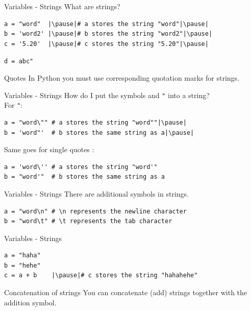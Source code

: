 \documentclass[dvipsnames, svgnames, x11names]{beamer}
\begin{document}
\begin{frame}[fragile]{Variables - Strings}
What are strings?\pause\\

\begin{verbatim}
a = "word"  |\pause|# a stores the string "word"|\pause|
b = 'word2' |\pause|# b stores the string "word2"|\pause|
c = '5.20'  |\pause|# c stores the string "5.20"|\pause|
\end{verbatim}
\vspace{-0.275em}
\texttt{d = }{\color{BrickRed}\texttt{\textquotesingle abc"}}\pause {} \pause
\begin{block}{Quotes}
In Python you must use corresponding quotation marks for strings.
\end{block}
\end{frame}

\begin{frame}[fragile]{Variables - Strings}
How do I put the symbols \texttt{\textquotesingle} and \texttt{"} into a string?\pause\\
For \texttt{"}:\pause
	
\begin{verbatim}
a = "word\"" # a stores the string "word""|\pause|
b = 'word"'  # b stores the same string as a|\pause|
\end{verbatim}
\vspace{1em}
Same goes for single quotes \texttt{\textquotesingle}:
\begin{verbatim}
a = 'word\'' # a stores the string "word'"
b = "word'"  # b stores the same string as a
\end{verbatim}
\end{frame}

\begin{frame}[fragile]{Variables - Strings}
There are additional symbols in strings.
\begin{verbatim}
a = "word\n" # \n represents the newline character
b = "word\t" # \t represents the tab character
\end{verbatim}
\end{frame}

\begin{frame}[fragile]{Variables - Strings}
\begin{verbatim}
a = "haha"
b = "hehe"
c = a + b    |\pause|# c stores the string "hahahehe"
\end{verbatim}
\pause
\begin{block}{Concatenation of strings}
You can concatenate (add) strings together with the addition symbol.
\end{block}
\end{frame}
\end{document}
